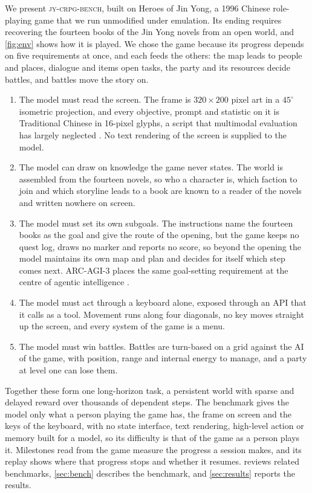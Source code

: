 \documentclass{article} %
\newcommand{\bench}{\textsc{jy-crpg-bench}}
\begin{document}
We present \bench{}, built on Heroes of Jin Yong, a 1996 Chinese role-playing game that we run unmodified under emulation. Its ending requires recovering the fourteen books of the Jin Yong novels from an open world, and \cref{fig:env} shows how it is played. We chose the game because its progress depends on five requirements at once, and each feeds the others: the map leads to people and places, dialogue and items open tasks, the party and its resources decide battles, and battles move the story on.
\begin{enumerate}[leftmargin=*,topsep=2pt,itemsep=1pt,parsep=0pt]
\item The model must read the screen. The frame is $320\times200$ pixel art in a $45^\circ$ isometric projection, and every objective, prompt and statistic on it is Traditional Chinese in 16-pixel glyphs, a script that multimodal evaluation has largely neglected \citep{tam2025vistw}. No text rendering of the screen is supplied to the model.
\item The model can draw on knowledge the game never states. The world is assembled from the fourteen novels, so who a character is, which faction to join and which storyline leads to a book are known to a reader of the novels and written nowhere on screen.
\item The model must set its own subgoals. The instructions name the fourteen books as the goal and give the route of the opening, but the game keeps no quest log, draws no marker and reports no score, so beyond the opening the model maintains its own map and plan and decides for itself which step comes next. ARC-AGI-3 places the same goal-setting requirement at the centre of agentic intelligence \citep{arc2026arcagi3}.
\item The model must act through a keyboard alone, exposed through an API that it calls as a tool. Movement runs along four diagonals, no key moves straight up the screen, and every system of the game is a menu.
\item The model must win battles. Battles are turn-based on a grid against the AI of the game, with position, range and internal energy to manage, and a party at level one can lose them.
\end{enumerate}
Together these form one long-horizon task, a persistent world with sparse and delayed reward over thousands of dependent steps. The benchmark gives the model only what a person playing the game has, the frame on screen and the keys of the keyboard, with no state interface, text rendering, high-level action or memory built for a model, so its difficulty is that of the game as a person plays it. Milestones read from the game measure the progress a session makes, and its replay shows where that progress stops and whether it resumes.  reviews related benchmarks, \cref{sec:bench} describes the benchmark, and \cref{sec:results} reports the results.
\end{document}
